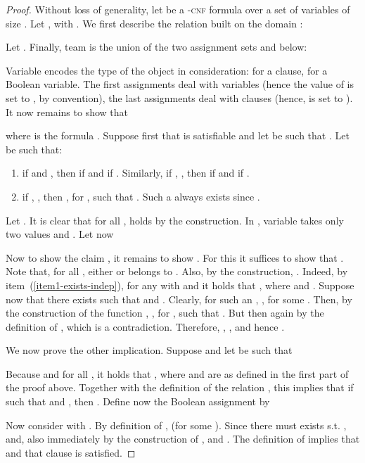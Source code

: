 \documentclass{article}
\theoremstyle{plain}
\theoremstyle{definition}
\newcommand{\pb}[1]{\textsc{#1}}
\begin{document}
\begin{proof}
Without loss of generality, let  be a -\pb{cnf} formula over a set  of variables of size . Let , with . We first describe the  relation  built on the domain :


Let .
Finally, team  is the union of the two assignment sets  and  below:


 

Variable  encodes the type of the object in consideration:  for a clause,  for a Boolean variable. The first  assignments deal with variables (hence the value of  is set to , by convention), the last  assignments deal with clauses (hence,  is set to ). It now remains to show that 


where   is the formula .
Suppose first that  is satisfiable and let  be such that . Let  be such that: 
\begin{enumerate}
\item\label{item1-exists-indep} if  and ,  then  if  and  if . Similarly, if , , then   if  and  if .

\item\label{item2-exists-indep} if , , then , for , such that . Such a  always exists since .
\end{enumerate}

Let . It is clear that for all ,  holds by the construction. In , variable  takes only two values  and . Let now



Now to  show the claim  , it remains to  show . For this it suffices to show that . Note that, for all , either  or  belongs to . Also, by the construction, . Indeed, by item~(\ref{item1-exists-indep}), for any  with  and   it holds that , where  and .
Suppose now that there exists  such that  and . Clearly, for such an ,  , for some . Then, by the construction of the function , , for , such that . But then again by the definition of ,  which is a contradiction. Therefore, , , and hence  .

We now prove the other implication.
Suppose   and let  be such that

 
 
 Because  and  for all , it holds that , where  and  are as defined in the first part of the proof above. Together with the definition of the relation , this implies that if  such that  and , then . 
 Define now the Boolean assignment  by
 
 

Now consider  with . By definition of ,  (for some ). Since  there must exists  s.t. ,  and, also immediately by the construction of ,  and . The definition of  implies that  and that clause  is satisfied.
\end{proof}
\end{document}

